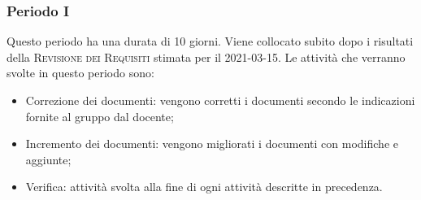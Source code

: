 \documentclass[../piano_di_progetto.tex]{subfiles}
\begin{document}


\subsubsection{Periodo I}
Questo periodo ha una durata di 10 giorni. Viene collocato subito dopo i risultati della \textsc{Revisione dei Requisiti} stimata per il 2021-03-15.
Le attività che verranno svolte in questo periodo sono:
\begin{itemize}
    \item Correzione dei documenti: vengono corretti i documenti secondo le indicazioni fornite al gruppo dal docente;
    \item Incremento dei documenti: vengono migliorati i documenti con modifiche e aggiunte;
    \item Verifica: attività svolta alla fine di ogni attività descritte in precedenza.
\end{itemize}
\end{document}
